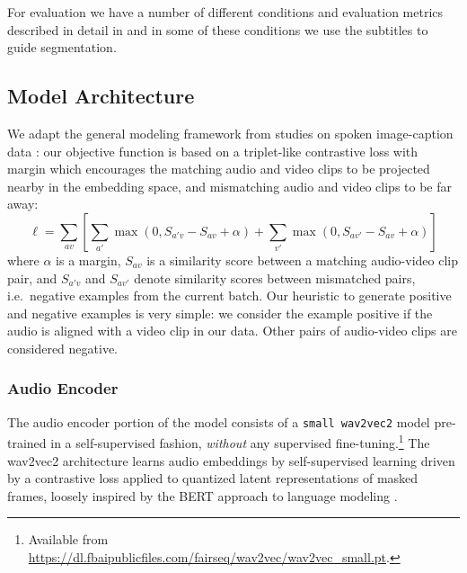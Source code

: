 For evaluation we have a number of different conditions and evaluation
metrics described in detail in  and in some of these
conditions we use the subtitles to guide
segmentation. 



\subsection{Model Architecture}
\label{sec:model}
We adapt the general modeling framework from studies on spoken
image-caption data
\citep{harwath2016unsupervised,chrupala-etal-2017-representations}:
our objective function is based on a triplet-like contrastive loss with margin which
encourages the matching audio and video clips to be projected nearby in
the embedding space, and mismatching audio and video clips to be far
away:
\begin{dmath}
  \ell = \sum_{av}\left[\sum_{a'} \max(0, S_{a'v} - S_{av} +
    \alpha) + \sum_{v'} \max(0, S_{av'} - S_{av} + \alpha) \right]
  \label{eq:triplet}
\end{dmath}
where $\alpha$ is a margin, $S_{av}$ is a similarity score between a
matching audio-video clip pair, and $S_{a'v}$ and $S_{av'}$ denote
similarity scores between mismatched pairs, i.e.\ negative examples
from the current batch. Our heuristic to generate positive and
negative examples is very simple: we consider the example
positive if the audio is aligned with a video clip in our
data. Other pairs of audio-video clips are considered negative.

\subsubsection{Audio Encoder}
The audio encoder portion of the model consists of a {\tt small
  wav2vec2} model \citep{wav2vec2} pre-trained in a self-supervised
fashion, \emph{without} any supervised fine-tuning.\footnote{Available from
  \url{https://dl.fbaipublicfiles.com/fairseq/wav2vec/wav2vec_small.pt}.}
The {\sc wav2vec2} architecture learns audio embeddings by
self-supervised learning driven by a contrastive loss applied to 
quantized latent representations of masked frames, loosely inspired by
the BERT approach to language modeling \citep{devlin-etal-2019-bert}.

